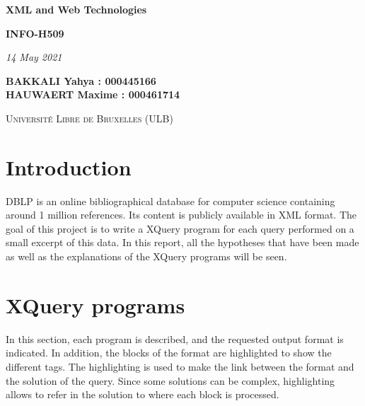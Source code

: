 \documentclass{article}
\begin{document}
\begin{titlepage}
    \begin{center}
        \vspace*{1cm}

        \Huge
        \textbf{XML and Web Technologies}
        \vspace{0.25cm}

        \LARGE
        \textbf{INFO-H509}

        \vspace{0.25cm}
        \LARGE

        \vspace{0.25cm}
        \textit{14 May 2021}

        \vspace{3cm}
           \Large
        \textbf{BAKKALI Yahya : 000445166 \\}
        \textbf{HAUWAERT Maxime : 000461714 \\}

        \vspace{2cm}

        \textsc{Université Libre de Bruxelles (ULB)}


    \end{center}
\end{titlepage}

\tableofcontents
\newpage

\section{Introduction}

DBLP is an online bibliographical database for computer science containing around 1 million references. Its content is publicly available in XML format. The goal of this project is to write a XQuery program for each query performed on a small excerpt of this data. In this report, all the hypotheses that have been made as well as the explanations of the XQuery programs will be seen.

\section{XQuery programs}
In this section, each program is described, and the requested output format is indicated. In addition, the blocks of the format are highlighted to show the different tags. The highlighting is used to make the link between the format and the solution of the query. Since some solutions can be complex, highlighting allows to refer in the solution to where each block is processed.\\
\end{document}
